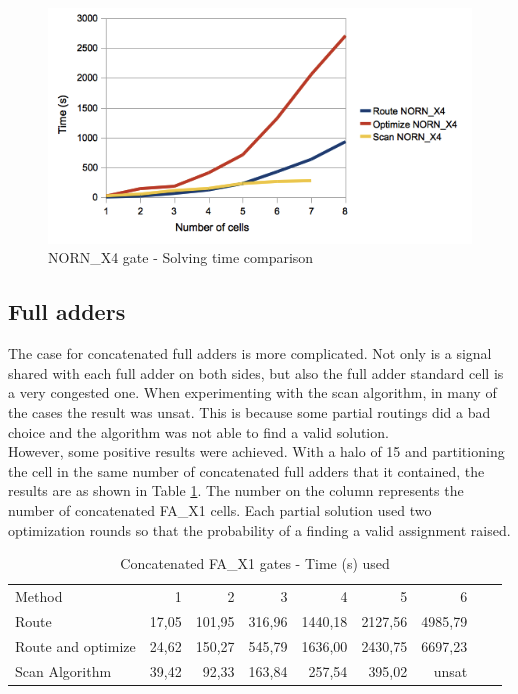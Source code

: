 \begin{figure}[h!]
  \centering
  \includegraphics[scale=0.7]{img/results/norn.png}
  \caption{NORN\_X4 gate - Solving time comparison}
  \label{fig:norn}
\end{figure} 

\subsection{Full adders}

The case for concatenated full adders is more complicated. Not only is a signal shared with each full adder on both sides, but also the full adder standard cell is a very congested one. When experimenting with the scan algorithm, in many of the cases the result was unsat. This is because some partial routings did a bad choice and the algorithm was not able to find a valid solution. \\

However, some positive results were achieved. With a halo of 15 and partitioning the cell in the same number of concatenated full adders that it contained, the results are as shown in Table \ref{tab:scanadder}. The number on the column represents the number of concatenated FA\_X1 cells. Each partial solution used two optimization rounds so that the probability of a finding a valid assignment raised. \\


\begin{table}
\centering
\begin{tabular}{|l|r|r|r|r|r|r|r|r|}
\cline{1-7}
Method & 1 & 2 & 3 & 4 & 5 & 6\\ \cline{1-7}
Route & 17,05 & 101,95 & 316,96 & 1440,18 & 2127,56 & 4985,79 \\ \hline
Route and optimize & 24,62 & 150,27 & 545,79 & 1636,00 & 2430,75 & 6697,23 \\ \hline
Scan Algorithm & 39,42 & 92,33 & 163,84 & 257,54 & 395,02 & unsat\\ \cline{1-7}
\end{tabular}
\caption{Concatenated FA\_X1 gates - Time (s) used}
\label{tab:scanadder}
\end{table}

